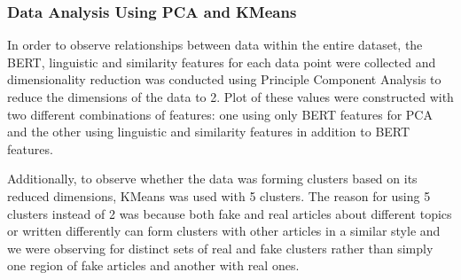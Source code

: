 \documentclass{article}
\begin{document}
\subsubsection{Data Analysis Using PCA and KMeans}

In order to observe relationships between data within the entire dataset, the BERT, linguistic and similarity features for each data point were collected and dimensionality reduction was conducted using Principle Component Analysis to reduce the dimensions of the data to 2. Plot of these values were constructed with two different combinations of features: one using only BERT features for PCA and the other using linguistic and similarity features in addition to BERT features.

Additionally, to observe whether the data was forming clusters based on its reduced dimensions, KMeans was used with 5 clusters. The reason for using 5 clusters instead of 2 was because both fake and real articles about different topics or written differently can form clusters with other articles in a similar style and we were observing for distinct sets of real and fake clusters rather than simply one region of fake articles and another with real ones.
\end{document}
